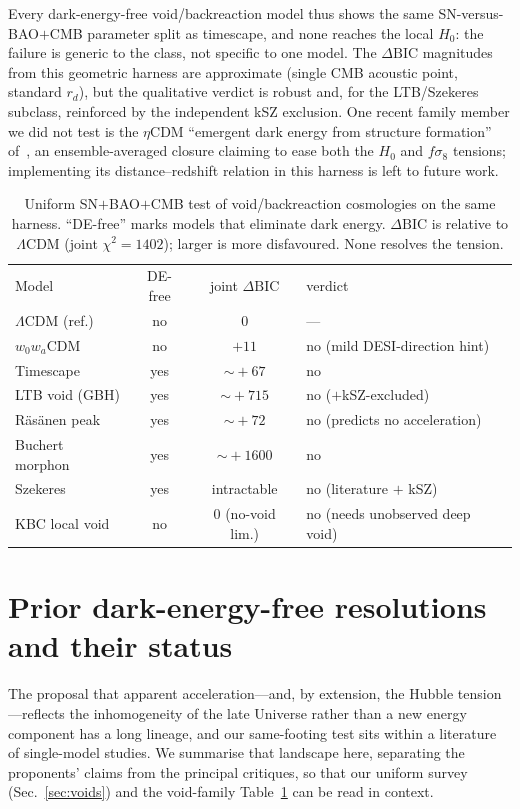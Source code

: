 \documentclass[aps,prd,twocolumn,nofootinbib,superscriptaddress,floatfix]{revtex4-2}
\newcommand{\Ho}{H_{0}}
\newcommand{\Lcdm}{\Lambda\mathrm{CDM}}
\newcommand{\dBIC}{\Delta\mathrm{BIC}}
\begin{document}
Every dark-energy-free void/backreaction model thus shows the same
SN-versus-BAO$+$CMB parameter split as timescape, and none reaches the local
$\Ho$: the failure is generic to the class, not specific to one model. The
$\dBIC$ magnitudes from this geometric harness are approximate (single CMB
acoustic point, standard $r_d$), but the qualitative verdict is robust and, for
the LTB/Szekeres subclass, reinforced by the independent kSZ exclusion. One recent
family member we did not test is the $\eta$CDM ``emergent dark energy from structure
formation'' of~\cite{Lapi2025}, an ensemble-averaged closure claiming to ease both the
$\Ho$ and $f\sigma_8$ tensions; implementing its distance--redshift relation in this
harness is left to future work.

\begin{table}[t]
\caption{Uniform SN$+$BAO$+$CMB test of void/backreaction cosmologies on the same
harness. ``DE-free'' marks models that eliminate dark energy. $\dBIC$ is relative
to $\Lcdm$ (joint $\chi^2=1402$); larger is more disfavoured. None resolves the
tension.}
\label{tab:voids}
\begin{ruledtabular}
\begin{tabular}{lccl}
Model & DE-free & joint $\dBIC$ & verdict \\
\colrule
$\Lcdm$ (ref.)   & no  & $0$              & --- \\
$w_0w_a$CDM      & no  & $+11$            & no (mild DESI-direction hint) \\
Timescape        & yes & $\sim\!+67$      & no \\
LTB void (GBH)   & yes & $\sim\!+715$     & no ($+$kSZ-excluded) \\
R\"as\"anen peak & yes & $\sim\!+72$      & no (predicts no acceleration) \\
Buchert morphon  & yes & $\sim\!+1600$    & no \\
Szekeres         & yes & intractable      & no (literature $+$ kSZ) \\
KBC local void   & no  & $0$ (no-void lim.) & no (needs unobserved deep void) \\
\end{tabular}
\end{ruledtabular}
\end{table}

\section{Prior dark-energy-free resolutions and their status}
\label{sec:related}
The proposal that apparent acceleration---and, by extension, the Hubble
tension---reflects the inhomogeneity of the late Universe rather than a new
energy component has a long lineage, and our same-footing test sits within a
literature of single-model studies. We summarise that landscape here, separating
the proponents' claims from the principal critiques, so that our uniform survey
(Sec.~\ref{sec:voids}) and the void-family Table~\ref{tab:voids} can be read in
context.
\end{document}
